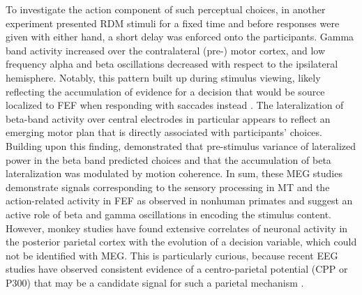 To investigate the action component of such perceptual choices, in another experiment \textcite{Donner2009} presented RDM stimuli for a fixed time and before responses were given with either hand, a short delay was enforced onto the participants. Gamma band activity increased over the contralateral (pre-) motor cortex, and low frequency alpha and beta oscillations decreased with respect to the ipsilateral hemisphere. Notably, this pattern built up during stimulus viewing, likely reflecting the accumulation of evidence for a decision that would be source localized to FEF when responding with saccades instead \parencite{Herding2017}. The lateralization of beta-band activity over central electrodes in particular appears to reflect an emerging motor plan that is directly associated with participants’ choices. Building upon this finding, \textcite{DeLange2013} demonstrated that pre-stimulus variance of lateralized power in the beta band predicted choices and that the accumulation of beta lateralization was modulated by motion coherence. In sum, these MEG studies demonstrate signals corresponding to the sensory processing in MT and the action-related activity in FEF as observed in nonhuman primates and suggest an active role of beta and gamma oscillations in encoding the stimulus content. However, monkey studies have found extensive correlates of neuronal activity in the posterior parietal cortex with the evolution of a decision variable, which could not be identified with MEG. This is particularly curious, because recent EEG studies have observed consistent evidence of a centro-parietal potential (CPP or P300) that may be a candidate signal for such a parietal mechanism \parencite{Kelly2015}.  
